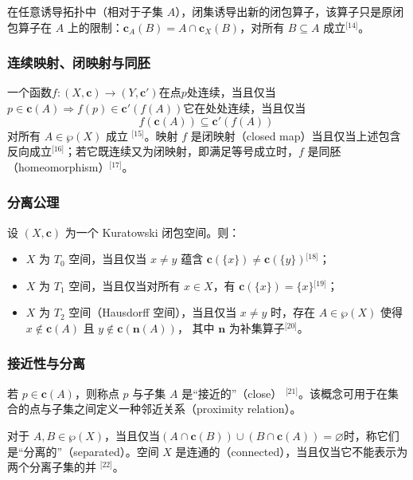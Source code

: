 在任意诱导拓扑中（相对于子集 $A$），闭集诱导出新的闭包算子，该算子只是原闭包算子在 $A$ 上的限制：$\mathbf{c}_{A}(B) = A \cap \mathbf{c}_{X}(B)$，对所有 $B \subseteq A$ 成立\(^\text{[14]}\)。
\subsubsection{连续映射、闭映射与同胚}
一个函数$f : (X, \mathbf{c}) \to (Y, \mathbf{c}')$在点$p$处连续，当且仅当$p \in \mathbf{c}(A) \Rightarrow f(p) \in \mathbf{c}'(f(A))$它在处处连续，当且仅当
$$
f(\mathbf{c}(A)) \subseteq \mathbf{c}'(f(A))~
$$
对所有 $A \in \wp(X)$ 成立 \(^\text{[15]}\)。映射 $f$ 是闭映射（closed map）当且仅当上述包含反向成立\(^\text{[16]}\)；若它既连续又为闭映射，即满足等号成立时，$f$ 是同胚（homeomorphism）\(^\text{[17]}\)。
\subsubsection{分离公理}
设 $(X, \mathbf{c})$ 为一个 Kuratowski 闭包空间。则：
\begin{itemize}
\item $X$ 为 $T_{0}$ 空间，当且仅当 $x \neq y$ 蕴含 $\mathbf{c}(\{x\}) \neq \mathbf{c}(\{y\})$\(^\text{[18]}\)；
\item $X$ 为 $T_{1}$ 空间，当且仅当对所有 $x \in X$，有 $\mathbf{c}(\{x\}) = \{x\}$\(^\text{[19]}\)；
\item $X$ 为 $T_{2}$ 空间（Hausdorff 空间），当且仅当 $x \neq y$ 时，存在 $A \in \wp(X)$ 使得$x \notin \mathbf{c}(A)$ 且 $y \notin \mathbf{c}(\mathbf{n}(A))$，
其中 $\mathbf{n}$ 为补集算子\(^\text{[20]}\)。
\end{itemize}
\subsubsection{接近性与分离}
若 $p \in \mathbf{c}(A)$，则称点 $p$ 与子集 $A$ 是“接近的”（close） \(^\text{[21]}\)。该概念可用于在集合的点与子集之间定义一种邻近关系（proximity relation）。

对于 $A, B \in \wp(X)$，当且仅当$(A \cap \mathbf{c}(B)) \cup (B \cap \mathbf{c}(A)) = \varnothing$时，称它们是“分离的”（separated）。空间 $X$ 是连通的（connected），当且仅当它不能表示为两个分离子集的并 \(^\text{[22]}\)。

